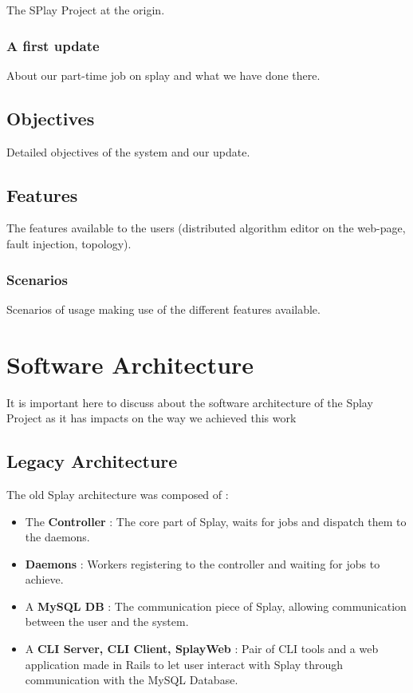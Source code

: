 \documentclass{eplmastersthesis}
\begin{document}
        The SPlay Project at the origin.

      \subsection{A first update}

        About our part-time job on splay and what we have done there.

    \section{Objectives}

      Detailed objectives of the system and our update.

    \section{Features}

      The features available to the users (distributed algorithm editor on the
      web-page, fault injection, topology).

      \subsection{Scenarios}

        Scenarios of usage making use of the different features available.


  \chapter{Software Architecture}

    It is important here to discuss about the software architecture of the
    Splay Project as it has impacts on the way we achieved this work

    \section{Legacy Architecture}

      The old Splay architecture was composed of :

      \begin{itemize}
        \item The \textbf{Controller} : The core part of Splay, waits for jobs
        and dispatch them to the daemons.
        \item \textbf{Daemons} : Workers registering to the controller and waiting
        for jobs to achieve.
        \item A \textbf{MySQL DB} : The communication piece of Splay, allowing
        communication between the user and the system.
        \item A \textbf{CLI Server, CLI Client, SplayWeb} : Pair of CLI tools
        and a web application made in Rails to let user interact with
        Splay through communication with the MySQL Database.
      \end{itemize}
\end{document}
